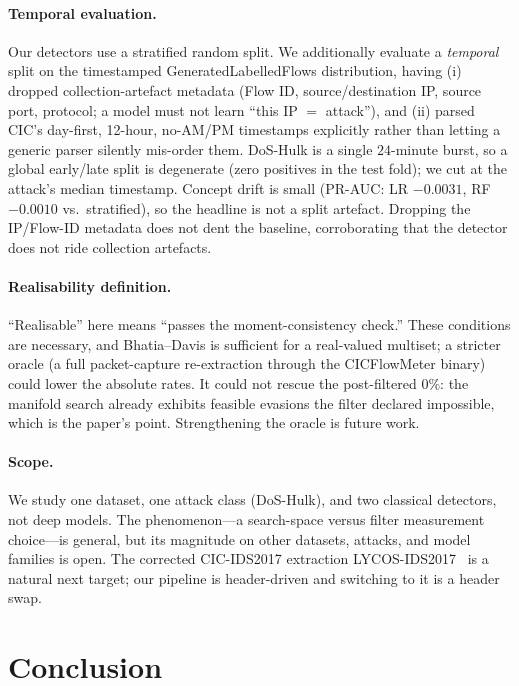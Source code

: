 \documentclass[10pt,twocolumn]{article}
\begin{document}
\paragraph{Temporal evaluation.}
Our detectors use a stratified random split. We additionally evaluate a
\emph{temporal} split on the timestamped GeneratedLabelledFlows distribution,
having (i) dropped collection-artefact metadata (Flow ID, source/destination IP,
source port, protocol; a model must not learn ``this IP $=$ attack''), and (ii)
parsed CIC's day-first, 12-hour, no-AM/PM timestamps explicitly rather than letting
a generic parser silently mis-order them. DoS-Hulk is a single $24$-minute burst,
so a global early/late split is degenerate (zero positives in the test fold); we
cut at the attack's median timestamp. Concept drift is small (PR-AUC: LR
$-0.0031$, RF $-0.0010$ vs.\ stratified), so the headline is not a split artefact.
Dropping the IP/Flow-ID metadata does not dent the baseline, corroborating that
the detector does not ride collection artefacts.

\paragraph{Realisability definition.}
``Realisable'' here means ``passes the moment-consistency check.'' These
conditions are necessary, and Bhatia--Davis is sufficient for a real-valued
multiset; a stricter oracle (a full packet-capture re-extraction through the
CICFlowMeter binary) could lower the absolute rates. It could not rescue the
post-filtered $0\%$: the manifold search already exhibits feasible evasions the
filter declared impossible, which is the paper's point. Strengthening the oracle
is future work.

\paragraph{Scope.}
We study one dataset, one attack class (DoS-Hulk), and two classical detectors,
not deep models. The phenomenon---a search-space versus filter measurement
choice---is general, but its magnitude on other datasets, attacks, and model
families is open. The corrected CIC-IDS2017 extraction
LYCOS-IDS2017~\cite{rosay2021lycos} is a natural next target; our pipeline is
header-driven and switching to it is a header swap.

\section{Conclusion}
\end{document}
